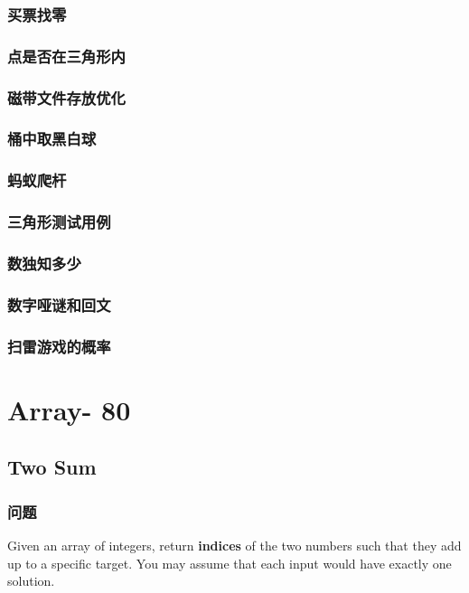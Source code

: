 \documentclass[UTF8,a4paper,12pt]{ctexbook}
\begin{document}
		\subsection{买票找零}
		
		\subsection{点是否在三角形内}
		
		\subsection{磁带文件存放优化}
		
		\subsection{桶中取黑白球}
		
		\subsection{蚂蚁爬杆}
		
		\subsection{三角形测试用例}
		
		\subsection{数独知多少}
		
		\subsection{数字哑谜和回文}
		
		\subsection{扫雷游戏的概率}
	
	
\chapter{Array- 80}
	\section{Two Sum} 
	\subsection{问题}
		Given an array of integers, return \textbf{indices} of the two numbers such that they add up to a specific target.	
		You may assume that each input would have exactly one solution.	
		
\end{document}
